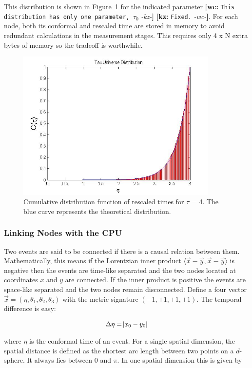 \documentclass[preprint,notitlepage,amsmath,amssymb,floatfix]{revtex4-1}
\newcommand{\XXX}[3]{{\bf [#1: } {\tt #3} {\it -#2-}{\bf ]}}
\begin{document}
\noindent This distribution is shown in Figure~\ref{fig:tau_cdf} for the indicated parameter \XXX{wc}{kz}{This distribution has only one parameter, $\tau_0$} \XXX{kz}{wc}{Fixed.}.
For each node, both its conformal and rescaled time are stored in memory to avoid redundant calculations in the measurement stages.
This requires only 4 x N extra bytes of memory so the tradeoff is worthwhile.

\begin{figure}
\includegraphics[width=10cm]{figures/tau_dist.jpg}
\caption{Cumulative distribution function of rescaled times for $\tau$ = 4.  The blue curve represents the theoretical distribution.}
\label{fig:tau_cdf}
\centering
\end{figure}

\subsubsection{Linking Nodes with the CPU}
Two events are said to be connected if there is a causal relation between them.  
Mathematically, this means if the Lorentzian inner product $\langle \vec x - \vec y, \vec x - \vec y\rangle$ is negative then the events are time-like separated and the two nodes located at coordinates $x$ and $y$ are connected.  
If the inner product is positive the events are space-like separated and the two nodes remain disconnected.
Define a four vector $\vec x = \left(\eta, \theta_1, \theta_2, \theta_3\right)$ with the metric signature $\left(-1,+1,+1,+1\right)$.
The temporal difference is easy:

\begin{equation}
\Delta\eta = \abs{x_0 - y_0}
\end{equation}

\noindent where $\eta$ is the conformal time of an event.  
For a single spatial dimension, the spatial distance is defined as the shortest arc length between two points on a $d$-sphere.  
It always lies between 0 and $\pi$.
In one spatial dimension this is given by
\end{document}
